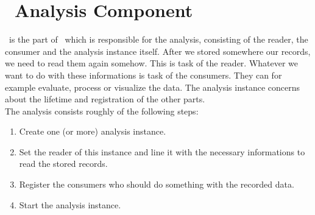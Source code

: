 \chapter{\Kieker\ Analysis Component}
      \KiekerAnalysis\ is the part of \Kieker\ which is responsible for the analysis, consisting of the reader, the consumer and the analysis instance itself. After we stored somewhere our records, we need to read them again somehow. This is task of the reader. Whatever we want to do with these informations is task of the consumers. They can for example evaluate, process or visualize the data. The analysis instance concerns about the lifetime and registration of the other parts.\\
      The analysis consists roughly of the following steps:
      \begin{enumerate}
	\item Create one (or more) analysis instance.
	\item Set the reader of this instance and line it with the necessary informations to read the stored records.
	\item Register the consumers who should do something with the recorded data.
	\item Start the analysis instance.
      \end{enumerate}

